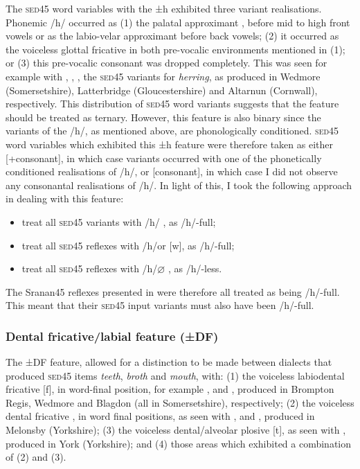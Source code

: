 {{{{{{{{{The \textsc{sed45} word variables with the ±h exhibited three variant realisations. Phonemic /h/ occurred as (1) the palatal approximant \textipa{[j]}, before mid to high front vowels or as the labio-velar approximant \textipa{[w]} before back vowels; (2) it occurred as the voiceless glottal fricative \textipa{[h]} in both pre-vocalic environments mentioned in (1); or (3) this pre-vocalic consonant was dropped completely. This was seen for example with \textipa{[jE\:rIn]}, \textipa{[hE\:rIn]}, \textipa{[E\:r@n]}, the \textsc{sed45} variants for  \emph{herring}, as produced in Wedmore (Somersetshire), Latterbridge (Gloucestershire) and Altarnun (Cornwall), respectively. This distribution of \textsc{sed45} word variants suggests that the feature should be treated as ternary. However, this feature is also binary since the variants of the /h/, as mentioned above, are phonologically conditioned. \textsc{sed45} word variables which exhibited this ±h feature were therefore taken as either [+consonant], in which case variants occurred with one of the phonetically conditioned realisations of /h/, or [\textminus consonant], in which case I did not observe any consonantal realisations of /h/. In light of this, I took the following approach in dealing with this feature:

\begin{itemize}
\item {treat all \textsc{sed45} variants with /h/ \textrightarrow [h], as /h/-full;}
\item {treat all \textsc{sed45} reflexes with /h/\textrightarrow [j] or [w], as /h/-full;}
\item{treat all \textsc{sed45} reflexes with /h/\textrightarrow $\varnothing$ , as /h/-less.}
\end{itemize}

The Sranan45 reflexes presented in  were therefore all treated as being /h/-full. This meant that their \textsc{sed45} input variants must also have been /h/-full.

\subsubsection{Dental fricative/labial feature (±DF)} \label{3.3.2.4}
The ±DF feature, allowed for a distinction to be made between dialects that produced \textsc{sed45} items \emph{teeth},  \emph{broth} and  \emph{mouth}, with: (1) the voiceless labiodental fricative [f], in word-final position, for example \textipa{[ti:f]}, \textipa{[b\:rO:f]} and \textipa{[m\ae Uf]}, produced in Brompton Regis, Wedmore and Blagdon (all in Somersetshire), respectively; (2) the voiceless dental fricative \textipa{[T]}, in word final positions, as seen with \textipa{[ti:T]}, \textipa{[br6T]}  and \textipa{[m2UT]}, produced in Melonsby (Yorkshire); (3) the voiceless dental/alveolar plosive [t], as seen with \textipa{[br6t]}, produced in York (Yorkshire); and (4) those areas which exhibited a combination of (2) and (3).

}}}}}}}}}
